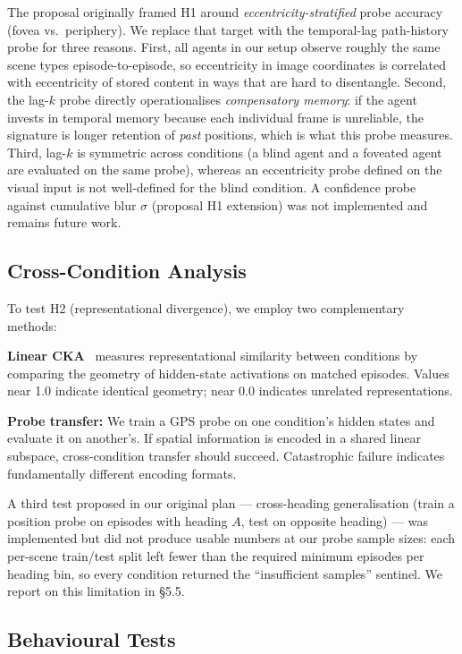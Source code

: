 \documentclass[10pt,conference,compsocconf]{IEEEtran}
\begin{document}
The proposal originally framed H1 around \emph{eccentricity-stratified} probe accuracy (fovea vs.\ periphery). We replace that target with the temporal-lag path-history probe for three reasons. First, all agents in our setup observe roughly the same scene types episode-to-episode, so eccentricity in image coordinates is correlated with eccentricity of stored content in ways that are hard to disentangle. Second, the lag-$k$ probe directly operationalises \emph{compensatory memory}: if the agent invests in temporal memory because each individual frame is unreliable, the signature is longer retention of \emph{past} positions, which is what this probe measures. Third, lag-$k$ is symmetric across conditions (a blind agent and a foveated agent are evaluated on the same probe), whereas an eccentricity probe defined on the visual input is not well-defined for the blind condition. A confidence probe against cumulative blur $\sigma$ (proposal H1 extension) was not implemented and remains future work.

\subsection{Cross-Condition Analysis}

To test H2 (representational divergence), we employ two complementary methods:

\textbf{Linear CKA}~\cite{kornblith2019cka} measures representational similarity between conditions by comparing the geometry of hidden-state activations on matched episodes. Values near 1.0 indicate identical geometry; near 0.0 indicates unrelated representations.

\textbf{Probe transfer:} We train a GPS probe on one condition's hidden states and evaluate it on another's. If spatial information is encoded in a shared linear subspace, cross-condition transfer should succeed. Catastrophic failure indicates fundamentally different encoding formats.

A third test proposed in our original plan --- cross-heading generalisation (train a position probe on episodes with heading $A$, test on opposite heading) --- was implemented but did not produce usable numbers at our probe sample sizes: each per-scene train/test split left fewer than the required minimum episodes per heading bin, so every condition returned the ``insufficient samples'' sentinel. We report on this limitation in §5.5.

\subsection{Behavioural Tests}
\end{document}
